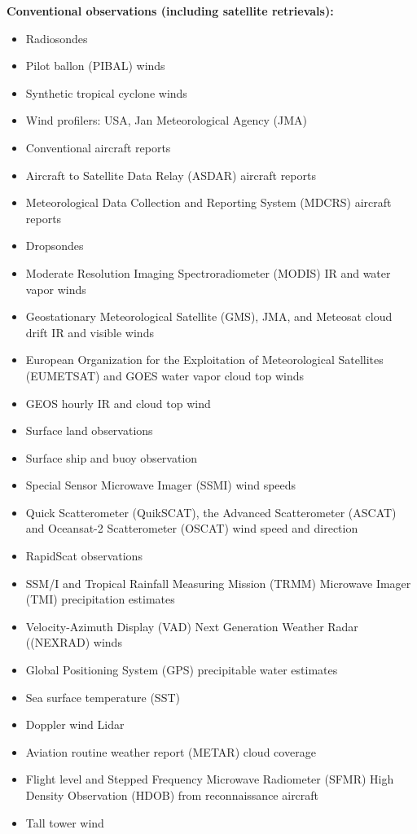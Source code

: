 \textbf{Conventional observations (including satellite retrievals):}
\begin{itemize}
\item Radiosondes
\item Pilot ballon (PIBAL) winds
\item Synthetic tropical cyclone winds
\item Wind profilers: USA, Jan Meteorological Agency (JMA)
\item Conventional aircraft reports
\item Aircraft to Satellite Data Relay (ASDAR) aircraft reports
\item Meteorological Data Collection and Reporting System (MDCRS) aircraft reports
\item Dropsondes
\item Moderate Resolution Imaging Spectroradiometer (MODIS) IR and water vapor winds
\item Geostationary Meteorological Satellite (GMS), JMA, and Meteosat cloud drift IR and visible winds 
\item European Organization for the Exploitation of Meteorological Satellites (EUMETSAT) and GOES water vapor cloud top winds
\item GEOS hourly IR and cloud top wind
\item Surface land observations
\item Surface ship and buoy observation
\item Special Sensor Microwave Imager (SSMI) wind speeds
\item Quick Scatterometer (QuikSCAT), the Advanced Scatterometer (ASCAT) and Oceansat-2 Scatterometer (OSCAT) wind speed and direction
\item RapidScat observations
\item SSM/I and Tropical Rainfall Measuring Mission (TRMM) Microwave Imager (TMI) precipitation estimates
\item Velocity-Azimuth Display (VAD) Next Generation Weather Radar ((NEXRAD) winds
\item Global Positioning System (GPS) precipitable water estimates
\item Sea surface temperature (SST)
\item Doppler wind Lidar
\item Aviation routine weather report (METAR) cloud coverage
\item Flight level and Stepped Frequency Microwave Radiometer (SFMR) High Density
Observation (HDOB) from reconnaissance aircraft
\item Tall tower wind
\end{itemize}


